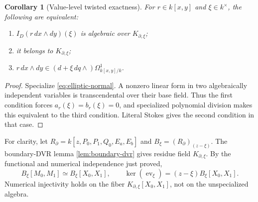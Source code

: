 \documentclass[11pt]{article}
\numberwithin{equation}{section}
\newtheorem{corollary}[corollary]{Corollary}
\theoremstyle{definition}
\theoremstyle{remark}
\begin{document}
\begin{corollary}[Value-level twisted exactness]\label{cor:value-exactness}
For $r\in k[x,y]$ and $\xi\in k^\times$, the following are equivalent:
\begin{enumerate}
\item $I_D(r\,dx\wedge dy)(\xi)$ is algebraic over $K_{\partial,\xi}$;
\item it belongs to $K_{\partial,\xi}$;
\item $r\,dx\wedge dy\in(d+\xi\,dq\wedge)\Omega^1_{k[x,y]/k}$.
\end{enumerate}
\end{corollary}
\begin{proof}
Specialize \eqref{eq:elliptic-normal}. A nonzero linear form in two
algebraically independent variables is transcendental over their base
field. Thus the first condition forces $a_r(\xi)=b_r(\xi)=0$, and
specialized polynomial division makes this equivalent to the third
condition. Literal Stokes gives the second condition in that case.
\end{proof}

For clarity, let $R_\partial=k[z,P_0,P_1,Q_0,E_a,E_b]$ and
$B_\xi=(R_\partial)_{(z-\xi)}$. The boundary-DVR lemma
\cref{lem:boundary-dvr} gives residue field $K_{\partial,\xi}$.
By the functional and numerical independence just proved,
\[
 B_\xi[M_0,M_1]\simeq B_\xi[X_0,X_1],\qquad
 \ker(\operatorname{ev}_\xi)=(z-\xi)B_\xi[X_0,X_1].
\]
Numerical injectivity holds on the fiber
$K_{\partial,\xi}[X_0,X_1]$, not on the unspecialized algebra.
\end{document}
